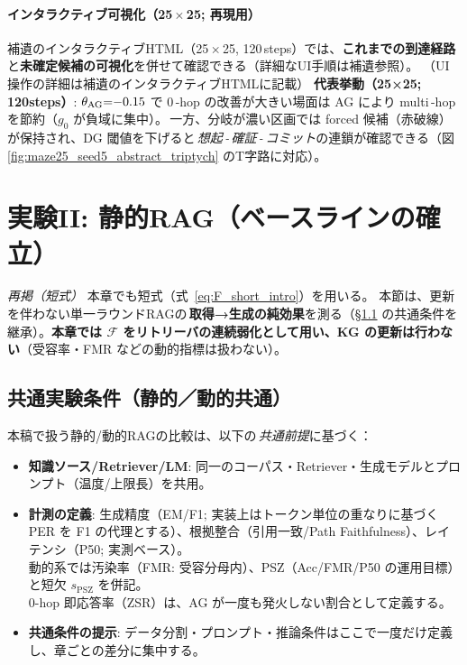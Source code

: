 \documentclass[ja=standard,xelatex]{bxjsarticle}
\newcommand{\F}{\mathcal{F}}
\begin{document}
\paragraph{インタラクティブ可視化（25\,$\times$\,25; 再現用）}
補遺のインタラクティブHTML（25\,$\times$\,25, 120\,steps）では、\textbf{これまでの到達経路}と\textbf{未確定候補の可視化}を併せて確認できる（詳細なUI手順は補遺参照）。
\noindent（UI操作の詳細は補遺のインタラクティブHTMLに記載）
\noindent\textbf{代表挙動（25×25; 120steps）}: $\theta_{\rm AG}{=}{-}0.15$ で 0\,\mbox{-}hop の改善が大きい場面は AG により multi\,\mbox{-}hop を節約（$g_0$ が負域に集中）。\,一方、分岐が濃い区画では forced 候補（赤破線）が保持され、DG 閾値を下げると\,\textit{想起\,\mbox{-}\,確証\,\mbox{-}\,コミット}の連鎖が確認できる（図\,\ref{fig:maze25_seed5_abstract_triptych} のT字路に対応）。

\section{実験II: 静的RAG（ベースラインの確立）}
\noindent\textit{再掲（短式）}\; 本章でも短式（式~\ref{eq:F_short_intro}）を用いる。
\label{sec:rag_experiment}
本節は、更新を伴わない単一ラウンドRAGの\,\textbf{取得→生成の純効果}を測る（\S\ref{sec:common_setup} の共通条件を継承）。\;\textbf{本章では $\F$ をリトリーバの連続弱化として用い、KG の更新は行わない}（受容率・FMR などの動的指標は扱わない）。

\subsection{共通実験条件（静的／動的共通）}\label{sec:common_setup}
本稿で扱う静的/動的RAGの比較は、以下の\,\emph{共通前提}に基づく：
\begin{itemize}[leftmargin=1.6em]
  \item \textbf{知識ソース/Retriever/LM}: 同一のコーパス・Retriever・生成モデルとプロンプト（温度/上限長）を共用。
  \item \textbf{計測の定義}: 生成精度（EM/F1; 実装上はトークン単位の重なりに基づく PER を F1 の代理とする）、根拠整合（引用一致/Path Faithfulness）、レイテンシ（P50; 実測ベース）。\\
        動的系では汚染率（FMR: 受容分母内）、PSZ（Acc/FMR/P50 の運用目標）と短欠 $s_{\mathrm{PSZ}}$ を併記。\\
        0-hop 即応答率（ZSR）は、AG が一度も発火しない割合として定義する。
  \item \textbf{共通条件の提示}: データ分割・プロンプト・推論条件はここで一度だけ定義し、章ごとの差分に集中する。
\end{itemize}
\end{document}
